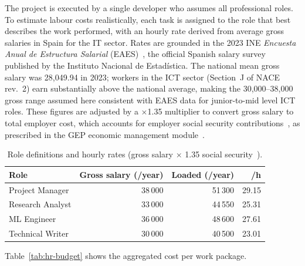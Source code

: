 \documentclass[11pt, a4paper]{article}
\begin{document}
The project is executed by a single developer who assumes all professional roles. To estimate labour costs realistically, each task is assigned to the role that best describes the work performed, with an hourly rate derived from average gross salaries in Spain for the IT sector. Rates are grounded in the 2023 INE \textit{Encuesta Anual de Estructura Salarial} (EAES)~\cite{ineEncuestaEstructuraSalarial2023}, the official Spanish salary survey published by the Instituto Nacional de Estad\'istica. The national mean gross salary was \EUR{}28{,}049.94 in 2023; workers in the ICT sector (Section~J of NACE rev.~2) earn substantially above the national average, making the \EUR{}30{,}000--38{,}000 gross range assumed here consistent with EAES data for junior-to-mid level ICT roles. These figures are adjusted by a $\times$1.35 multiplier to convert gross salary to total employer cost, which accounts for employer social security contributions~\cite{segSocialCotizacion2025}, as prescribed in the GEP economic management module~\cite{gepModule24EconomicManagement}.
\begin{table}[h!]
    \centering
    \caption{Role definitions and hourly rates (gross salary $\times$ 1.35 social security~\cite{segSocialCotizacion2025}).}
    \label{tab:roles}
    \renewcommand{\arraystretch}{1.1}
    \begin{tabularx}{\linewidth}{l r r r}
        \toprule
        \textbf{Role} & \textbf{Gross salary (\EUR{}/year)} & \textbf{Loaded (\EUR{}/year)} & \textbf{\EUR{}/h}\footnotemark \\
        \midrule
        Project Manager   & 38\,000 & 51\,300 & 29.15 \\
        Research Analyst   & 33\,000 & 44\,550 & 25.31 \\
        ML Engineer        & 36\,000 & 48\,600 & 27.61 \\
        Technical Writer   & 30\,000 & 40\,500 & 23.01 \\
        \bottomrule
    \end{tabularx}
\end{table}

Table~\ref{tab:hr-budget} shows the aggregated cost per work package.
\end{document}
